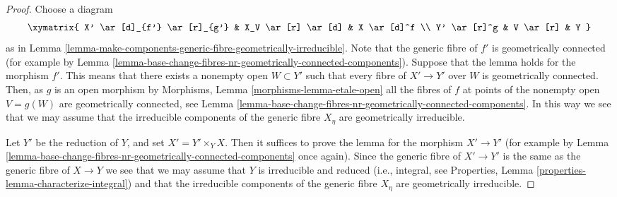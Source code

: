 \begin{proof}
Choose a diagram
$$
\xymatrix{
X' \ar[d]_{f'} \ar[r]_{g'} & X_V \ar[r] \ar[d] & X \ar[d]^f \\
Y' \ar[r]^g & V \ar[r] & Y
}
$$
as in
Lemma \ref{lemma-make-components-generic-fibre-geometrically-irreducible}.
Note that the generic fibre of $f'$ is geometrically connected
(for example by
Lemma \ref{lemma-base-change-fibres-nr-geometrically-connected-components}).
Suppose that the lemma holds for the morphism $f'$. This means that
there exists a nonempty open $W \subset Y'$ such that every fibre of
$X' \to Y'$ over $W$ is geometrically connected.
Then, as $g$ is an open morphism by
Morphisms, Lemma \ref{morphisms-lemma-etale-open}
all the fibres of $f$ at points of the nonempty open $V = g(W)$ are
geometrically connected, see
Lemma \ref{lemma-base-change-fibres-nr-geometrically-connected-components}.
In this way we see that we may assume that the irreducible
components of the generic fibre $X_\eta$ are geometrically irreducible.

\medskip\noindent
Let $Y'$ be the reduction of $Y$, and set $X' = Y' \times_Y X$.
Then it suffices to prove the lemma for the morphism $X' \to Y'$
(for example by
Lemma \ref{lemma-base-change-fibres-nr-geometrically-connected-components}
once again). Since the generic fibre of $X' \to Y'$ is the same as the
generic fibre of $X \to Y$ we see that we may assume that $Y$ is
irreducible and reduced (i.e., integral, see
Properties, Lemma \ref{properties-lemma-characterize-integral})
and that the irreducible
components of the generic fibre $X_\eta$ are geometrically irreducible.


\end{proof}
